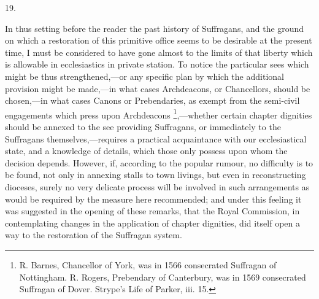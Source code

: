 19.

In thus setting before the reader the past
history of Suffragans, and the ground on which a restoration of this
primitive office seems to be desirable at the present time, I must be
considered to have gone almost to the limits of that liberty which is
allowable in ecclesiastics in private station. To notice the
particular sees which might be thus strengthened,—or any specific
plan by which the additional provision might be made,—in what cases
Archdeacons, or Chancellors, should be chosen,—in what cases Canons
or Prebendaries, as exempt from the semi-civil engagements which press
upon Archdeacons \footnote{R. Barnes, Chancellor of York, was in 1566 consecrated Suffragan of
Nottingham. R. Rogers, Prebendary of Canterbury, was in 1569
consecrated Suffragan of Dover. Strype's Life of Parker, iii. 15.},—whether
certain chapter dignities should be annexed to the see providing
Suffragans, or immediately to the Suffragans themselves,—requires a
practical acquaintance with our ecclesiastical state, and a knowledge
of details, which those only possess upon whom the decision depends.
However, if, according to the popular rumour, no difficulty is to be
found, not only in annexing stalls to town livings, but even in
reconstructing dioceses, surely no very delicate process will be
involved in such arrangements as would be required by the measure here
recommended; and under this feeling it was suggested in the opening of
these remarks, that the Royal Commission, in contemplating changes in
the application of chapter dignities, did itself open a way to
the restoration of the Suffragan system.

